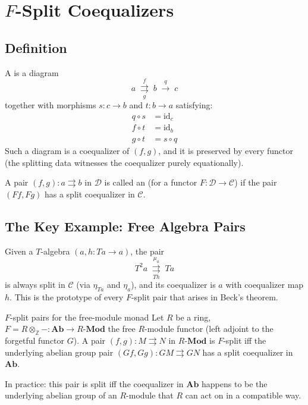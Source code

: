 \section{$F$-Split Coequalizers}
\label{sec:f-split}

\subsection{Definition}

\begin{definition}
A  is a diagram
\[
  a \;\underset{g}{\overset{f}{\rightrightarrows}}\; b \;\overset{q}{\to}\; c
\]
together with morphisms $s : c \to b$ and $t : b \to a$ satisfying:
\begin{align*}
  q \circ s &= \mathrm{id}_c \\
  f \circ t &= \mathrm{id}_b \\
  g \circ t &= s \circ q
\end{align*}
Such a diagram is a coequalizer of $(f,g)$, and it is preserved by every
functor (the splitting data witnesses the coequalizer purely equationally).

A pair $(f, g) : a \rightrightarrows b$ in $\mathcal{D}$ is called an
 (for a functor $F : \mathcal{D} \to \mathcal{C}$)
if the pair $(Ff, Fg)$ has a split coequalizer in $\mathcal{C}$.
\end{definition}

\subsection{The Key Example: Free Algebra Pairs}

Given a $T$-algebra $(a, h : Ta \to a)$, the pair
\[
  T^2 a \;\underset{Th}{\overset{\mu_a}{\rightrightarrows}}\; Ta
\]
is always split in $\mathcal{C}$ (via $\eta_{Ta}$ and $\eta_a$), and its
coequalizer is $a$ with coequalizer map $h$. This is the prototype of
every $F$-split pair that arises in Beck's theorem.

\begin{example}{$F$-split pairs for the free-module monad}
Let $R$ be a ring, $F = R \otimes_\mathbb{Z} - : \mathbf{Ab} \to
R\text{-}\mathbf{Mod}$ the free $R$-module functor (left adjoint to
the forgetful functor $G$). A pair $(f,g) : M \rightrightarrows N$ in
$R\text{-}\mathbf{Mod}$ is $F$-split iff the underlying abelian group pair
$(Gf, Gg) : GM \rightrightarrows GN$ has a split coequalizer in
$\mathbf{Ab}$.

In practice: this pair is split iff the coequalizer in $\mathbf{Ab}$
happens to be the underlying abelian group of an $R$-module that $R$
can act on in a compatible way.
\end{example}

